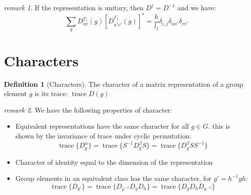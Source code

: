 \documentclass{amsart}
\theoremstyle{remark}
\newtheorem*{remark}{remark}
\theoremstyle{remark}
\theoremstyle{definition}
\newtheorem*{definition}{Definition}
\DeclareMathOperator{\Tr}{trace}
\begin{document}
\begin{remark}
    If the representation is unitary, then $D^{\dagger} = D^{-1}$ and we have:
    \begin{equation*}
        \sum_g D^{\Gamma_i}_{uv}(g)\left[D^{\Gamma_j}_{u'v'}(g)\right]^* = \frac{h}{l_j} \delta_{i,j}\delta_{uu'}\delta_{vv'}
    \end{equation*}
\end{remark}

\vspace{10pt}
\section*{Characters}
\begin{definition}
    [Characters]
    The character of a matrix representation of a group element $g$ is its trace: $\Tr D(g)$
\end{definition}
\begin{remark}
We have the following properties of character:
\begin{itemize}
    \item Equivalent representations have the same character for all $g \in G$. this is shown by the 
        invariance of trace under cyclic permutation:
        \begin{equation*}
            \Tr\{ D^{\alpha}_g \} = \Tr \{S^{-1}D^{\beta}_gS\} = \Tr \{D^{\beta}_g S S^{-1} \}
        \end{equation*}
    \item Character of identity equal to the dimension of the representation
    \item Group elements in an equivalent class has the same character, for $g' = h^{-1}gh$:
    \begin{equation*}
        \Tr\{ D_{g'} \} = \Tr \{D_{h^{-1}} D_{g} D_{h}\} = \Tr \{D_{g} D_{h}D_{h^{-1}} \}
    \end{equation*}
\end{itemize}
\end{remark}

\vspace{10pt}
\end{document}
